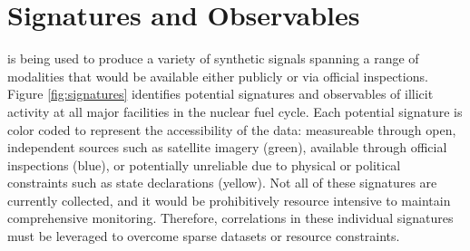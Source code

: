 \section{Signatures and Observables}
\label{s_signatures}

\Cyclus is being used to produce a variety of synthetic signals spanning a range of modalities that would be available either publicly or via official inspections.  Figure \ref{fig:signatures} identifies potential signatures and observables of illicit activity at all major facilities in the nuclear fuel cycle.  Each potential signature is color coded to represent the accessibility of the data: measureable through open, independent sources such as satellite imagery (green), available through official inspections (blue), or potentially unreliable due to physical or political constraints such as state declarations (yellow).  Not all of these signatures are currently collected, and it would be prohibitively resource intensive to maintain comprehensive monitoring. Therefore, correlations in these individual signatures must be leveraged to overcome sparse datasets or resource constraints.

